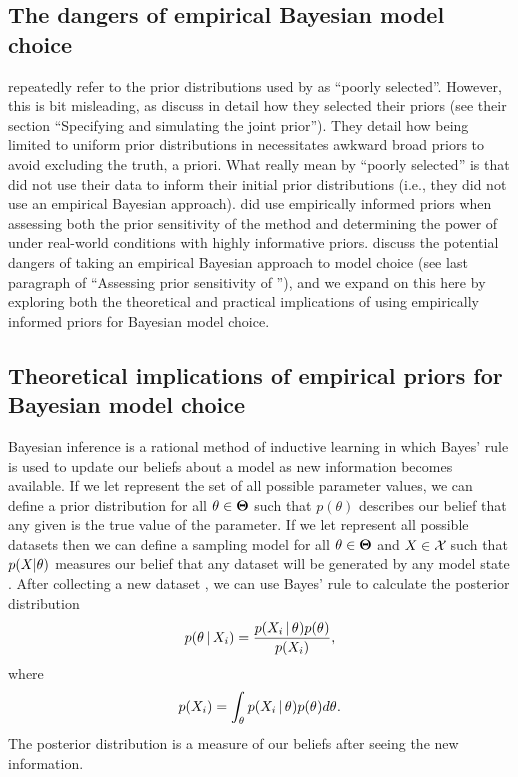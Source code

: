 \documentclass[letterpaper,12pt]{article}
\begin{document}
\begin{linenumbers}
\section*{The dangers of empirical Bayesian model choice}
\citet{Hickerson2013} repeatedly refer to the prior distributions used by
\citet{Oaks2012} as ``poorly selected''.
However, this is bit misleading, as \citet{Oaks2012} discuss in detail how they
selected their priors (see their section ``Specifying and simulating the joint
prior'').
They detail how being limited to uniform prior distributions in \msb
necessitates awkward broad priors to avoid excluding the truth, a priori.
What \citet{Hickerson2013} really mean by ``poorly selected'' is that
\citet{Oaks2012} did not use their data to inform their initial prior
distributions (i.e., they did not use an empirical Bayesian approach).
\citet{Oaks2012} did use empirically informed priors when assessing
both the prior sensitivity of the method and determining the power of \msb
under real-world conditions with highly informative priors.
\citet{Oaks2012} discuss the potential dangers of taking an empirical Bayesian
approach to model choice (see last paragraph of ``Assessing prior sensitivity
of \msb''), and we expand on this here by exploring both the theoretical and
practical implications of using empirically informed priors for Bayesian
model choice.

\subsection*{Theoretical implications of empirical priors for Bayesian model
choice}
\begin{linenomath}
Bayesian inference is a rational method of inductive learning in which Bayes'
rule is used to update our beliefs about a model as new information becomes
available.
If we let \allParameterValues represent the set of all possible parameter
values, we can define a prior distribution for all $\theta \in
\boldsymbol{\Theta}$ such that $p(\theta)$ describes our belief that any given
\myTheta{} is the true value of the parameter.
If we let \allDatasets represent all possible datasets then we can 
define a sampling model for all $\theta \in
\boldsymbol{\Theta}$ and $\alignment{}{} \in \allDatasets$ such that
$p(\alignment{}{} | \theta)$ measures our belief that any dataset \alignment{}{}
will be generated by any model state \myTheta{}.
After collecting a new dataset , we can use Bayes' rule to
calculate the posterior distribution
\begin{equation}
    p(\myTheta{} \given \alignment{i}{}) = \frac{p(\alignment{i}{} \given 
    \myTheta{})p(\myTheta{})}{p(\alignment{i}{})},
    \label{eq:bayesrule}
\end{equation}
where
\begin{equation}
    p(\alignment{i}{}) = \int_{\myTheta{}} p(\alignment{i}{} \given
    \myTheta{})p(\myTheta{}) d\myTheta{}.
\end{equation}
The posterior distribution is a measure of our beliefs after seeing the new
information.
\end{linenomath}


\end{linenumbers}
\end{document}
